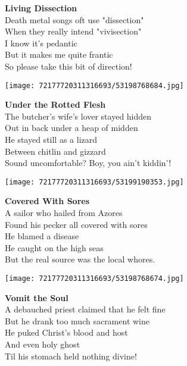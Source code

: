 \documentclass[10pt,letterpaper]{article}
\begin{document}
\begin{center}
\textbf{Living Dissection}\\
\vskip 0.2in
Death metal songs oft use "dissection"\\
When they really intend "vivisection"\\
I know it's pedantic\\
But it makes me quite frantic\\
So please take this bit of direction!\\
\end{center}
\pagebreak

\begin{center}\texttt{[image: 72177720311316693/53198768684.jpg]}
\end{center}
\begin{center}
\textbf{Under the Rotted Flesh}\\
\vskip 0.2in
The butcher's wife's lover stayed hidden\\
Out in back under a heap of midden\\
He stayed still as a lizard\\
Between chitlin and gizzard\\
Sound uncomfortable?  Boy, you ain't kiddin'!\\
\end{center}
\pagebreak

\begin{center}\texttt{[image: 72177720311316693/53199190353.jpg]}
\end{center}
\begin{center}
\textbf{Covered With Sores}\\
\vskip 0.2in
A sailor who hailed from Azores\\
Found his pecker all covered with sores\\
He blamed a disease\\
He caught on the high seas\\
But the real source was the local whores.\\
\end{center}
\pagebreak

\begin{center}
\texttt{[image: 72177720311316693/53198768674.jpg]}
\end{center}

\begin{center}
\textbf{Vomit the Soul}\\
\vskip 0.2in
A debauched priest claimed that he felt fine\\
But he drank too much sacrament wine\\
He puked Christ's blood and host\\
And even holy ghost\\
Til his stomach held nothing divine!\\
\end{center}
\pagebreak
\end{document}
